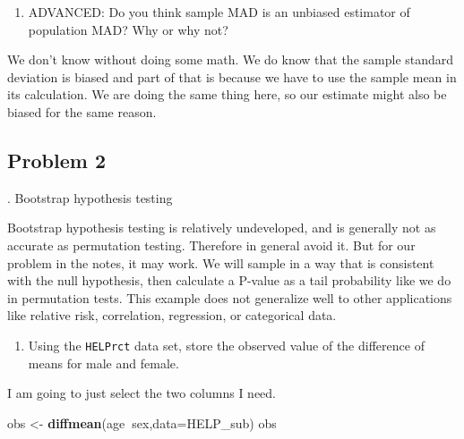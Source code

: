 \documentclass[
]{book}
\newenvironment{Shaded}{\begin{snugshade}}{\end{snugshade}}
\newcommand{\DataTypeTok}[1]{\textcolor[rgb]{0.13,0.29,0.53}{#1}}
\newcommand{\KeywordTok}[1]{\textcolor[rgb]{0.13,0.29,0.53}{\textbf{#1}}}
\newcommand{\NormalTok}[1]{#1}
\newcommand{\OperatorTok}[1]{\textcolor[rgb]{0.81,0.36,0.00}{\textbf{#1}}}
\newcommand{\StringTok}[1]{\textcolor[rgb]{0.31,0.60,0.02}{#1}}
\providecommand{\tightlist}{%
  \setlength{\itemsep}{0pt}\setlength{\parskip}{0pt}}
\begin{document}
\begin{enumerate}
\def\labelenumi{\alph{enumi}.}
\setcounter{enumi}{6}
\tightlist
\item
  ADVANCED: Do you think sample MAD is an unbiased estimator of population MAD? Why or why not?
\end{enumerate}

We don't know without doing some math. We do know that the sample standard deviation is biased and part of that is because we have to use the sample mean in its calculation. We are doing the same thing here, so our estimate might also be biased for the same reason.

\hypertarget{problem-2-22}{%
\subsection{Problem 2}\label{problem-2-22}}

. Bootstrap hypothesis testing

Bootstrap hypothesis testing is relatively undeveloped, and is generally not as accurate as permutation testing. Therefore in general avoid it. But for our problem in the notes, it may work. We will sample in a way that is consistent with the null hypothesis, then calculate a P-value as a tail probability like we do in permutation tests. This example does not generalize well to other applications like relative risk, correlation, regression, or categorical data.

\begin{enumerate}
\def\labelenumi{\alph{enumi}.}
\tightlist
\item
  Using the \texttt{HELPrct} data set, store the observed value of the difference of means for male and female.
\end{enumerate}

I am going to just select the two columns I need.

\begin{Shaded}
\end{Shaded}

\begin{Shaded}
\begin{Highlighting}[]
\NormalTok{obs <-}\StringTok{ }\KeywordTok{diffmean}\NormalTok{(age}\OperatorTok{~}\NormalTok{sex,}\DataTypeTok{data=}\NormalTok{HELP_sub)}
\NormalTok{obs}
\end{Highlighting}
\end{Shaded}
\end{document}
